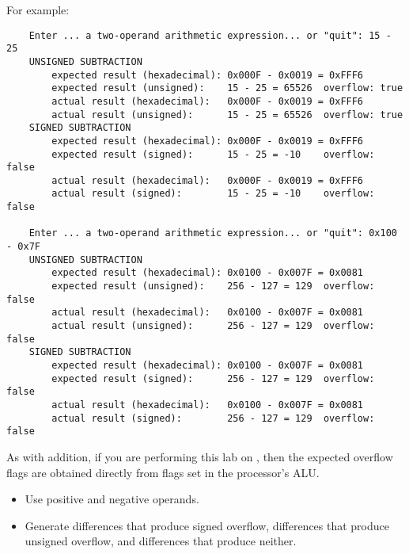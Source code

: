 \begin{description}
\end{description}
For example:
\begin{verbatim}
    Enter ... a two-operand arithmetic expression... or "quit": 15 - 25
    UNSIGNED SUBTRACTION
        expected result (hexadecimal): 0x000F - 0x0019 = 0xFFF6
        expected result (unsigned):    15 - 25 = 65526	overflow: true
        actual result (hexadecimal):   0x000F - 0x0019 = 0xFFF6
        actual result (unsigned):      15 - 25 = 65526	overflow: true
    SIGNED SUBTRACTION
        expected result (hexadecimal): 0x000F - 0x0019 = 0xFFF6
        expected result (signed):      15 - 25 = -10	overflow: false
        actual result (hexadecimal):   0x000F - 0x0019 = 0xFFF6
        actual result (signed):        15 - 25 = -10	overflow: false

    Enter ... a two-operand arithmetic expression... or "quit": 0x100 - 0x7F
    UNSIGNED SUBTRACTION
        expected result (hexadecimal): 0x0100 - 0x007F = 0x0081
        expected result (unsigned):    256 - 127 = 129	overflow: false
        actual result (hexadecimal):   0x0100 - 0x007F = 0x0081
        actual result (unsigned):      256 - 127 = 129	overflow: false
    SIGNED SUBTRACTION
        expected result (hexadecimal): 0x0100 - 0x007F = 0x0081
        expected result (signed):      256 - 127 = 129	overflow: false
        actual result (hexadecimal):   0x0100 - 0x007F = 0x0081
        actual result (signed):        256 - 127 = 129	overflow: false
\end{verbatim}

As with addition, if you are performing this lab on \runtimeenvironment, then the expected overflow flags are obtained directly from flags set in the processor's ALU\@.

\begin{description}
    \begin{itemize}
        \item Use positive and negative operands.
        \item Generate differences that produce signed overflow, differences that produce unsigned overflow, and differences that produce neither.
    \end{itemize}
\end{description}
